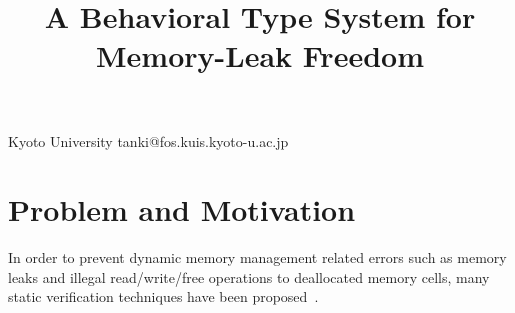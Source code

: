 \documentclass{sigplanconf}
\begin{document}
\setlength{\pdfpageheight}{\paperheight}
\setlength{\pdfpagewidth}{\paperwidth}


\title{A Behavioral Type System for Memory-Leak Freedom}

           {Kyoto University}
           {tanki@fos.kuis.kyoto-u.ac.jp}


\maketitle

\newcommand\tB{\;|\;}
\newcommand\LET{\mathbf{let}\;}
\newcommand\FREE{\mathbf{free(x)}}
\newcommand\IN{\mathbf{in}\;}
\newcommand\SKIP{\mathbf{skip}}
\newcommand\NULL{\mathbf{null}}
\newcommand\IFNULL{\mathbf{ifnull}\;}
\newcommand\THEN{\mathbf{then}\;}
\newcommand\ELSE{\mathbf{else}\;}
\newcommand\Rtab{\; \; \; \;}
\newcommand\Lcc{\left(}
\newcommand\Rcc{\right)}
\newcommand\Lfc{\left\{}
\newcommand\Rfc{\right\}}
\newcommand\Lb{\left[}
\newcommand\Rb{\right]}
\newcommand\coma{,\;}
\newcommand\MALLOC{\mathbf{malloc()}}
\newcommand\Malloc{\mathbf{malloc}}
\newcommand\Free{\mathbf{free}}
\newcommand\Cirx{(x)}
\newcommand\dtb{\;\;\ \;\;\ \;\;}
\newtheorem{exmp}{Example}[section]
\newcommand\TSEQ{;\!}
\newcommand\TSKIP{\mathbf{0}}
\newcommand\OVERFLOW{\mathbf{OutOfMemory}}
\newcommand\DOM{\mathbf{Dom}}
\newcommand\FUNTYPE{\varphi}
\newcommand\bs{\backslash}
\newcommand\MEMEX{\mathbf{MemEx}}
\newtheorem{theorem}{Theorem}[section]
\newtheorem{lemma}[theorem]{Lemma}
\newtheorem{proposition}[theorem]{Proposition}
\newtheorem{corollary}[theorem]{Corollary}
\newtheorem{myDef}{Definition}
\newtheorem{remark}{Remark}[section]
\newcommand\set[1]{\{#1\}}
\newcommand\COL{\!:\!}

\theoremstyle{definition}

\newenvironment{nospaceflalign*}
 {\setlength{\abovedisplayskip}{0pt}\setlength{\belowdisplayskip}{0pt}%
  \csname flalign*\endcsname}
 {\csname endflalign*\endcsname\ignorespacesafterend}

\section{Problem and Motivation}
In order to prevent dynamic memory management related errors such as
memory leaks and illegal read/write/free operations to deallocated
memory cells, many static verification techniques have been
proposed~\cite{DBLP:conf/aplas/SuenagaK09,DBLP:conf/pldi/HeineL03,DBLP:conf/sigsoft/XieA05,DBLP:journals/scp/SwamyHMGJ06,DBLP:conf/sas/OrlovichR06,DBLP:conf/issta/SuiYX12}.
\end{document}
